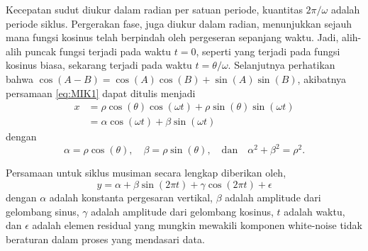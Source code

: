 \begin{spacing}{1.5}
	Kecepatan sudut diukur dalam radian per satuan periode, kuantitas $2\pi / \omega$ adalah periode siklus. Pergerakan fase, juga diukur dalam radian, menunjukkan sejauh mana fungsi kosinus telah berpindah oleh pergeseran sepanjang waktu. Jadi, alih-alih puncak fungsi terjadi pada waktu $t = 0$, seperti yang terjadi pada fungsi kosinus biasa, sekarang terjadi pada
	waktu $t = \theta/\omega$. Selanjutnya perhatikan bahwa $\cos(A-B) = \cos(A)\cos(B)+\sin(A)\sin(B)$, akibatnya persamaan \ref{eq:MIK1} dapat ditulis menjadi
	\begin{equation}
		\begin{aligned}
			x &= \rho \cos(\theta)\cos(\omega t) + \rho \sin(\theta)\sin(\omega t) \\
			&= \alpha\cos(\omega t) + \beta\sin(\omega t)
		\end{aligned}
	\end{equation}
	dengan 
	\begin{equation*}
		\alpha = \rho \cos(\theta), \quad 
		\beta = \rho \sin(\theta), \quad \text{dan} \quad
		\alpha^2 + \beta^2 = \rho^2.
	\end{equation*}

	Persamaan untuk siklus musiman  secara lengkap diberikan oleh,
	\begin{equation}\label{eq:sm}
		y = \alpha + \beta \sin(2\pi t)+\gamma \cos(2\pi t) + \epsilon
	\end{equation}
	dengan $\alpha$ adalah konstanta pergesaran vertikal, $\beta$ adalah amplitude dari gelombang sinus, $\gamma$ adalah amplitude dari gelombang kosinus, $t$ adalah waktu, dan $\epsilon$ adalah elemen residual yang mungkin mewakili komponen white-noise tidak beraturan dalam proses yang mendasari data.
\end{spacing}
\vspace{-0.1pc}
